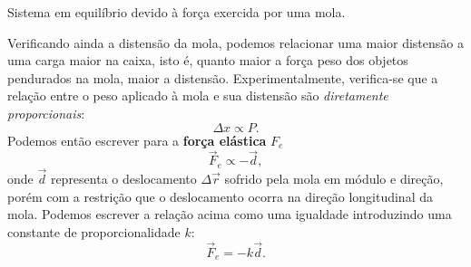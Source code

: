 \begin{marginfigure}
\centering
{}
\caption{Sistema em equilíbrio devido à força exercida por uma mola.\label{Fig:BlocoEquilDevidoForcaElastica}}
\end{marginfigure}

Verificando ainda a distensão da mola, podemos relacionar uma maior distensão a uma carga maior na caixa, isto é, quanto maior a força peso dos objetos pendurados na mola, maior a distensão. Experimentalmente, verifica-se que a relação entre o peso aplicado à mola e sua distensão são \emph{diretamente proporcionais}:
\begin{equation}
	\Delta x \propto P.
\end{equation}
%
Podemos então escrever para a \textbf{força elástica} $F_e$
\begin{equation}
	\vec{F}_e \propto -\vec{d},
\end{equation}
%
onde $\vec{d}$ representa o deslocamento $\Delta \vec{r}$ sofrido pela mola em módulo e direção, porém com a restrição que o deslocamento ocorra na direção longitudinal da mola. Podemos escrever a relação acima como uma igualdade introduzindo uma constante de proporcionalidade $k$:
\begin{equation}
	\vec{F}_e = -k \vec{d}.
\end{equation}

